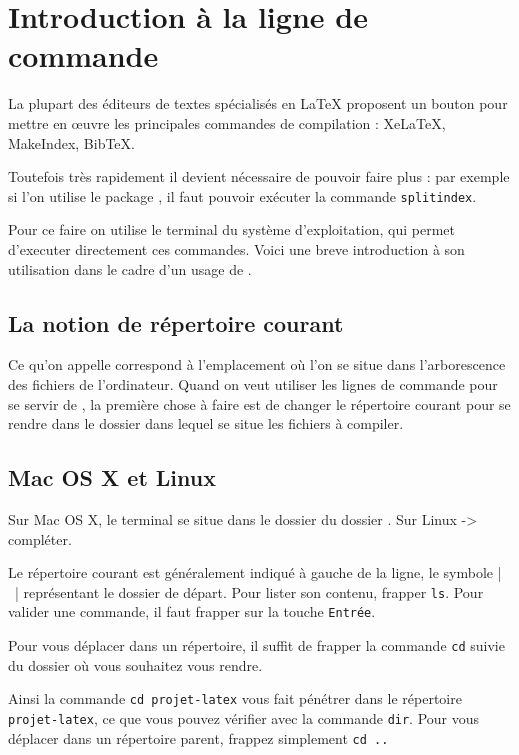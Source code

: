 \chapter{Introduction à la ligne de commande}\label{lignedecommande}

\begin{prealable}
La plupart des éditeurs de textes spécialisés en LaTeX  proposent un bouton pour mettre en œuvre les principales commandes de compilation :  XeLaTeX, MakeIndex, BibTeX.

Toutefois très rapidement il devient nécessaire de pouvoir faire plus : par exemple si l’on utilise le package , il faut pouvoir  exécuter la commande \verb|splitindex|.

Pour ce faire on utilise le terminal du système d'exploitation, qui permet d'executer directement ces commandes. Voici une breve introduction à son utilisation dans le cadre d'un usage de \XeLaTeX.
\end{prealable}

\section{La notion de répertoire courant}\label{repcourant}

Ce qu'on appelle  correspond à l'emplacement où l'on se situe dans l'arborescence des fichiers de l'ordinateur. Quand on veut utiliser les lignes de commande pour se servir de \XeLaTeX, la première chose à faire est de changer le répertoire courant pour se rendre dans le dossier dans lequel se situe les fichiers à compiler.

\section{Mac OS X et Linux}

Sur Mac OS X, le terminal se situe dans le dossier  du dossier . Sur Linux -> compléter.

Le répertoire courant est généralement indiqué à gauche de la ligne, le symbole  |~|  représentant le dossier de départ. Pour lister son contenu, frapper \verb|ls|. Pour valider une commande, il faut frapper sur la touche \verb|Entrée|.

Pour vous déplacer dans un répertoire, il suffit de frapper la commande
\verb|cd| suivie du dossier où vous souhaitez vous rendre.

Ainsi la commande \verb|cd projet-latex| vous fait pénétrer dans le
répertoire \verb|projet-latex|, ce que vous pouvez vérifier avec la
commande \verb|dir|. Pour vous déplacer dans un répertoire parent, frappez
simplement \verb|cd ..|

